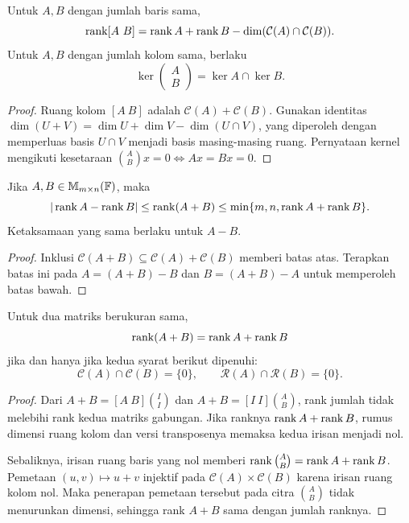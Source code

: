 \begin{prop}
    \label{rank:gabungan}
    Untuk $A,B$ dengan jumlah baris sama,
    \[
        \operatorname{rank}[A\ B]=\operatorname{rank} A+\operatorname{rank} B
        -\dim(\mathcal C(A)\cap\mathcal C(B)).
    \]
    Untuk $A,B$ dengan jumlah kolom sama, berlaku
    \[
        \ker\begin{pmatrix}A\\B\end{pmatrix}=\ker A\cap\ker B.
    \]
\end{prop}
\begin{proof}
    Ruang kolom $[A\ B]$ adalah $\mathcal C(A)+\mathcal C(B)$.
    Gunakan identitas
    $\dim(U+V)=\dim U+\dim V-\dim(U\cap V)$, yang diperoleh dengan
    memperluas basis $U\cap V$ menjadi basis masing-masing ruang.
    Pernyataan kernel mengikuti kesetaraan
    $\binom{A}{B}x=0\iff Ax=Bx=0$.
\end{proof}

\begin{teorema}
    Jika $A,B\in\mathbb{M}_{m\times n}(\mathbb{F})$, maka
    \[
        |\operatorname{rank} A-\operatorname{rank} B|\le\operatorname{rank}(A+B)
        \le\min\{m,n,\operatorname{rank} A+\operatorname{rank} B\}.
    \]
    Ketaksamaan yang sama berlaku untuk $A-B$.
\end{teorema}
\begin{proof}
    Inklusi $\mathcal C(A+B)\subseteq\mathcal C(A)+\mathcal C(B)$
    memberi batas atas. Terapkan batas ini pada
    $A=(A+B)-B$ dan $B=(A+B)-A$ untuk memperoleh batas bawah.
\end{proof}

\begin{teorema}
    Untuk dua matriks berukuran sama,
    \[
        \operatorname{rank}(A+B)=\operatorname{rank} A+\operatorname{rank} B
    \]
    jika dan hanya jika kedua syarat berikut dipenuhi:
    \[
        \mathcal C(A)\cap\mathcal C(B)=\{0\},\qquad
        \mathcal R(A)\cap\mathcal R(B)=\{0\}.
    \]
\end{teorema}
\begin{proof}
    Dari $A+B=[A\ B]\binom{I}{I}$ dan
    $A+B=[I\ I]\binom{A}{B}$, rank jumlah tidak melebihi rank kedua
    matriks gabungan. Jika ranknya $\operatorname{rank} A+\operatorname{rank} B$, rumus dimensi
    ruang kolom dan versi transposenya memaksa kedua irisan menjadi nol.

    Sebaliknya, irisan ruang baris yang nol memberi
    $\operatorname{rank}\binom{A}{B}=\operatorname{rank} A+\operatorname{rank} B$.
    Pemetaan $(u,v)\mapsto u+v$ injektif pada
    $\mathcal C(A)\times\mathcal C(B)$ karena irisan ruang kolom nol.
    Maka penerapan pemetaan tersebut pada citra $\binom{A}{B}$ tidak
    menurunkan dimensi, sehingga rank $A+B$ sama dengan jumlah ranknya.
\end{proof}

